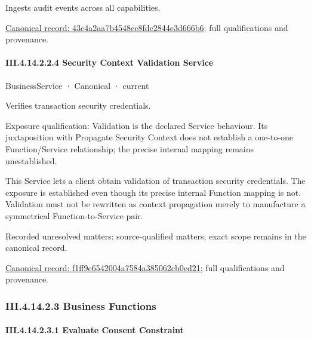 Ingests audit events across all capabilities.


{\footnotesize \href{../../../../../../../continuum/business/business-service/43c4a2aa7b4548ec8fdc2844e3d666b6.md}{Canonical record: 43c4a2aa7b4548ec8fdc2844e3d666b6}; full qualifications and provenance.}\par
\paragraph*{III.4.14.2.2.4 Security Context Validation Service}
\label{navigation:III.4.14.2.2.4}

\label{element:f1ff9e6542004a7584a385062cb0ed21}
{\small BusinessService · Canonical · current}\par

Verifies transaction security credentials.



Exposure qualification: Validation is the declared Service behaviour. Its juxtaposition with Propagate Security Context does not establish a one-to-one Function/Service relationship; the precise internal mapping remains unestablished.



This Service lets a client obtain validation of transaction security credentials. The exposure is established even though its precise internal Function mapping is not. Validation must not be rewritten as context propagation merely to manufacture a symmetrical Function-to-Service pair.


{\small Recorded unresolved matters: source-qualified matters; exact scope remains in the canonical record.}\par
{\footnotesize \href{../../../../../../../continuum/business/business-service/f1ff9e6542004a7584a385062cb0ed21.md}{Canonical record: f1ff9e6542004a7584a385062cb0ed21}; full qualifications and provenance.}\par
\subsubsection*{III.4.14.2.3 Business Functions}
\label{navigation:III.4.14.2.3}

\paragraph*{III.4.14.2.3.1 Evaluate Consent Constraint}
\label{navigation:III.4.14.2.3.1}

